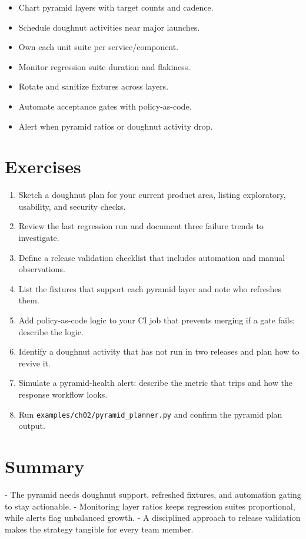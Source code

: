  \begin{itemize}
   \item Chart pyramid layers with target counts and cadence.
   \item Schedule doughnut activities near major launches.
   \item Own each unit suite per service/component.
   \item Monitor regression suite duration and flakiness.
   \item Rotate and sanitize fixtures across layers.
   \item Automate acceptance gates with policy-as-code.
   \item Alert when pyramid ratios or doughnut activity drop.
 \end{itemize}

 \section{Exercises}

 \begin{enumerate}
   \item Sketch a doughnut plan for your current product area, listing exploratory, usability, and security checks.
   \item Review the last regression run and document three failure trends to investigate.
   \item Define a release validation checklist that includes automation and manual observations.
   \item List the fixtures that support each pyramid layer and note who refreshes them.
   \item Add policy-as-code logic to your CI job that prevents merging if a gate fails; describe the logic.
   \item Identify a doughnut activity that has not run in two releases and plan how to revive it.
   \item Simulate a pyramid-health alert: describe the metric that trips and how the response workflow looks.
  \item Run \texttt{examples/ch02/pyramid\_planner.py} and confirm the pyramid plan output.
 \end{enumerate}

\section{Summary}

- The pyramid needs doughnut support, refreshed fixtures, and automation gating to stay actionable.
- Monitoring layer ratios keeps regression suites proportional, while alerts flag unbalanced growth.
- A disciplined approach to release validation makes the strategy tangible for every team member.

